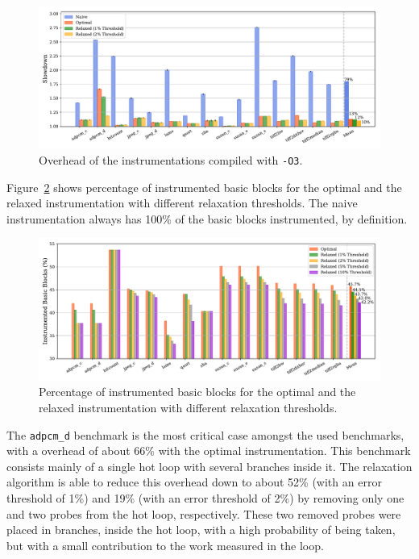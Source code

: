 \documentclass[sigplan,9pt]{acmart}
\begin{document}
\begin{figure}[htp]
    \centering
    \includegraphics[width=\textwidth]{figs/overhead-O3.pdf}
    \caption{Overhead of the instrumentations compiled with {\texttt{-O3}}.}
    \label{fig:overhead-O3}
\end{figure}

Figure~\ref{fig:instr} shows percentage of instrumented basic blocks for the optimal and the relaxed instrumentation with different relaxation thresholds.
The naive instrumentation always has 100\% of the basic blocks instrumented, by definition.

\begin{figure}[htp]
    \centering
    \includegraphics[width=\textwidth]{figs/instr.pdf}
    \caption{Percentage of instrumented basic blocks for the optimal and the relaxed instrumentation with different relaxation thresholds.}
    \label{fig:instr}
\end{figure}

The \texttt{adpcm\_d} benchmark is the most critical case amongst the used benchmarks, with a overhead of about 66\% with the optimal instrumentation.
This benchmark consists mainly of a single hot loop with several branches inside it.
The relaxation algorithm is able to reduce this overhead down to about 52\% (with an error threshold of 1\%) and 19\% (with an error threshold of 2\%) by removing only one and two probes from the hot loop, respectively.
These two removed probes were placed in branches, inside the hot loop, with a high probability of being taken, but with a small contribution to the work measured in the loop.
\end{document}
